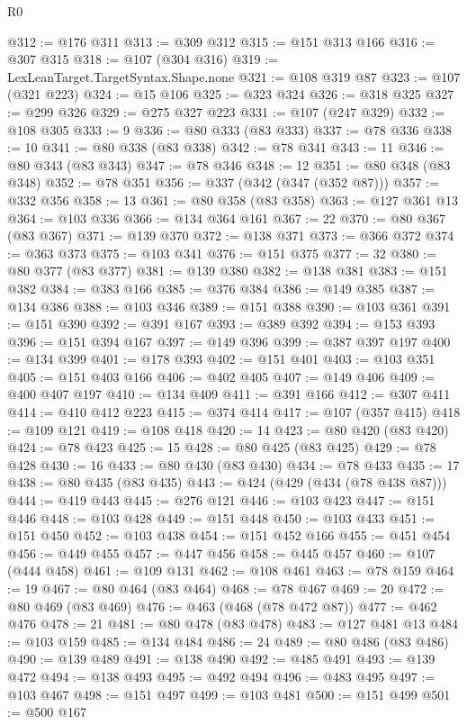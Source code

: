 \begin{lexlean}{R0}
\begin{coremodule}
@312 := @176 @311
@313 := @309 @312
@315 := @151 @313 @166
@316 := @307 @315
@318 := @107 (@304 @316)
@319 := LexLeanTarget.TargetSyntax.Shape.none
@321 := @108 @319 @87
@323 := @107 (@321 @223)
@324 := @15 @106
@325 := @323 @324
@326 := @318 @325
@327 := @299 @326
@329 := @275 @327 @223
@331 := @107 (@247 @329)
@332 := @108 @305
@333 := 9
@336 := @80 @333 (@83 @333)
@337 := @78 @336
@338 := 10
@341 := @80 @338 (@83 @338)
@342 := @78 @341
@343 := 11
@346 := @80 @343 (@83 @343)
@347 := @78 @346
@348 := 12
@351 := @80 @348 (@83 @348)
@352 := @78 @351
@356 := @337 (@342 (@347 (@352 @87)))
@357 := @332 @356
@358 := 13
@361 := @80 @358 (@83 @358)
@363 := @127 @361 @13
@364 := @103 @336
@366 := @134 @364 @161
@367 := 22
@370 := @80 @367 (@83 @367)
@371 := @139 @370
@372 := @138 @371
@373 := @366 @372
@374 := @363 @373
@375 := @103 @341
@376 := @151 @375
@377 := 32
@380 := @80 @377 (@83 @377)
@381 := @139 @380
@382 := @138 @381
@383 := @151 @382
@384 := @383 @166
@385 := @376 @384
@386 := @149 @385
@387 := @134 @386
@388 := @103 @346
@389 := @151 @388
@390 := @103 @361
@391 := @151 @390
@392 := @391 @167
@393 := @389 @392
@394 := @153 @393
@396 := @151 @394 @167
@397 := @149 @396
@399 := @387 @397 @197
@400 := @134 @399
@401 := @178 @393
@402 := @151 @401
@403 := @103 @351
@405 := @151 @403 @166
@406 := @402 @405
@407 := @149 @406
@409 := @400 @407 @197
@410 := @134 @409
@411 := @391 @166
@412 := @307 @411
@414 := @410 @412 @223
@415 := @374 @414
@417 := @107 (@357 @415)
@418 := @109 @121
@419 := @108 @418
@420 := 14
@423 := @80 @420 (@83 @420)
@424 := @78 @423
@425 := 15
@428 := @80 @425 (@83 @425)
@429 := @78 @428
@430 := 16
@433 := @80 @430 (@83 @430)
@434 := @78 @433
@435 := 17
@438 := @80 @435 (@83 @435)
@443 := @424 (@429 (@434 (@78 @438 @87)))
@444 := @419 @443
@445 := @276 @121
@446 := @103 @423
@447 := @151 @446
@448 := @103 @428
@449 := @151 @448
@450 := @103 @433
@451 := @151 @450
@452 := @103 @438
@454 := @151 @452 @166
@455 := @451 @454
@456 := @449 @455
@457 := @447 @456
@458 := @445 @457
@460 := @107 (@444 @458)
@461 := @109 @131
@462 := @108 @461
@463 := @78 @159
@464 := 19
@467 := @80 @464 (@83 @464)
@468 := @78 @467
@469 := 20
@472 := @80 @469 (@83 @469)
@476 := @463 (@468 (@78 @472 @87))
@477 := @462 @476
@478 := 21
@481 := @80 @478 (@83 @478)
@483 := @127 @481 @13
@484 := @103 @159
@485 := @134 @484
@486 := 24
@489 := @80 @486 (@83 @486)
@490 := @139 @489
@491 := @138 @490
@492 := @485 @491
@493 := @139 @472
@494 := @138 @493
@495 := @492 @494
@496 := @483 @495
@497 := @103 @467
@498 := @151 @497
@499 := @103 @481
@500 := @151 @499
@501 := @500 @167

\end{coremodule}
\end{lexlean}
